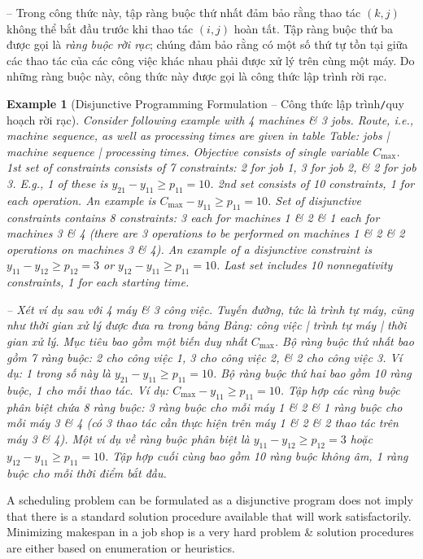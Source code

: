 \documentclass{article}
\newtheorem{example}{Example}
\begin{document}
\begin{itemize}
\begin{itemize}
        -- Trong công thức này, tập ràng buộc thứ nhất đảm bảo rằng thao tác $(k,j)$ không thể bắt đầu trước khi thao tác $(i,j)$ hoàn tất. Tập ràng buộc thứ ba được gọi là {\it ràng buộc rời rạc}; chúng đảm bảo rằng có một số thứ tự tồn tại giữa các thao tác của các công việc khác nhau phải được xử lý trên cùng một máy. Do những ràng buộc này, công thức này được gọi là công thức lập trình rời rạc.

        \begin{example}[Disjunctive Programming Formulation -- Công thức lập trình{\tt/}quy hoạch rời rạc]
            Consider following example with 4 machines \& 3 jobs. Route, i.e., machine sequence, as well as processing times are given in table {\sf Table: jobs | machine sequence | processing times}. Objective consists of single variable $C_{\max}$. 1st set of constraints consists of 7 constraints: 2 for job 1, 3 for job 2, \& 2 for job 3. E.g., 1 of these is $y_{21} - y_{11}\ge p_{11} = 10$. 2nd set consists of 10 constraints, 1 for each operation. An example is $C_{\max} - y_{11}\ge p_{11} = 10$. Set of disjunctive constraints contains 8 constraints: 3 each for machines 1 \& 2 \& 1 each for machines 3 \& 4 (there are 3 operations to be performed on machines 1 \& 2 \& 2 operations on machines 3 \& 4). An example of a disjunctive constraint is $y_{11} - y_{12}\ge p_{12} = 3$ or $y_{12} - y_{11}\ge p_{11} = 10$. Last set includes 10 nonnegativity constraints, 1 for each starting time.

            -- Xét ví dụ sau với 4 máy \& 3 công việc. Tuyến đường, tức là trình tự máy, cũng như thời gian xử lý được đưa ra trong bảng {\sf Bảng: công việc | trình tự máy | thời gian xử lý}. Mục tiêu bao gồm một biến duy nhất $C_{\max}$. Bộ ràng buộc thứ nhất bao gồm 7 ràng buộc: 2 cho công việc 1, 3 cho công việc 2, \& 2 cho công việc 3. Ví dụ: 1 trong số này là $y_{21} - y_{11}\ge p_{11} = 10$. Bộ ràng buộc thứ hai bao gồm 10 ràng buộc, 1 cho mỗi thao tác. Ví dụ: $C_{\max} - y_{11}\ge p_{11} = 10$. Tập hợp các ràng buộc phân biệt chứa 8 ràng buộc: 3 ràng buộc cho mỗi máy 1 \& 2 \& 1 ràng buộc cho mỗi máy 3 \& 4 (có 3 thao tác cần thực hiện trên máy 1 \& 2 \& 2 thao tác trên máy 3 \& 4). Một ví dụ về ràng buộc phân biệt là $y_{11} - y_{12}\ge p_{12} = 3$ hoặc $y_{12} - y_{11}\ge p_{11} = 10$. Tập hợp cuối cùng bao gồm 10 ràng buộc không âm, 1 ràng buộc cho mỗi thời điểm bắt đầu.
        \end{example}
        A scheduling problem can be formulated as a disjunctive program does not imply that there is a standard solution procedure available that will work satisfactorily. Minimizing makespan in a job shop is a very hard problem \& solution procedures are either based on enumeration or heuristics.


\end{itemize}
\end{itemize}
\end{document}
